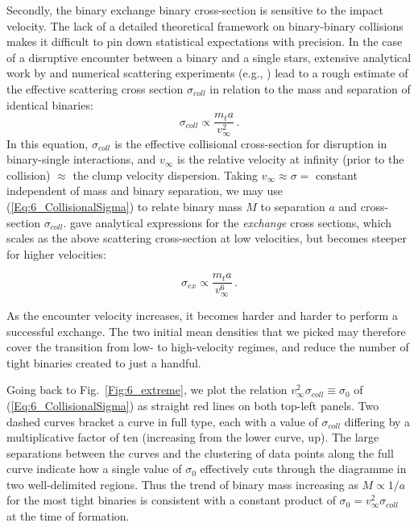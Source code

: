 Secondly, the binary exchange binary cross-section is sensitive to the impact velocity. The lack of a detailed theoretical framework on binary-binary collisions makes it difficult to pin down statistical expectations with precision. In the case of a disruptive encounter between a binary and a single stars, extensive 
analytical work by \cite{Mikkola1983,Mikkola1984a,Mikkola1984b} and numerical scattering experiments (e.g., \citealt{Heggie1996,Fregeau2004}) lead to a rough estimate of the effective scattering cross section $\sigma_{coll}$ in relation to the mass and separation of identical binaries: 
\begin{equation}
\sigma_{coll} \propto \frac{m_t a}{v_\infty^2}\, . 
\label{Eq:6_CollisionalSigma} 
\end{equation}
In this equation, $\sigma_{coll}$ is the effective collisional cross-section for disruption in binary-single  interactions, and $v_\infty$ is the relative velocity at infinity (prior to the collision) $\approx $ the clump velocity dispersion. Taking $ v_\infty \approx \sigma = $ constant independent of mass and binary separation, we may use (\ref{Eq:6_CollisionalSigma}) to relate binary mass $M$ to separation $a$ and  cross-section $\sigma_{coll}$. 
\cite{Hut1983,Hut1983b} gave analytical expressions for the \textit{exchange} cross sections, which scales as the above scattering cross-section at low velocities, but becomes steeper for higher velocities:

\begin{equation}
\sigma_{ex} \propto \frac{m_t a}{v_\infty^6}\, . 
\label{Eq:6_ExchangeSigma} 
\end{equation}
  
As the encounter velocity increases, it becomes harder and harder to perform a successful exchange. The two initial mean 
densities that we picked may therefore cover the transition from low- to high-velocity regimes, and reduce the number of tight binaries created to just a handful. 

Going back to Fig.~\ref{Fig:6_extreme}, we plot the relation $v^2_\infty \sigma_{coll} \equiv \sigma_0$ of (\ref{Eq:6_CollisionalSigma}) as straight red lines on both top-left panels. Two dashed curves bracket a curve in full type, each with a value of  $\sigma_{coll}$ differing by a multiplicative factor of ten (increasing from the lower curve, up).  The large separations between the curves and the clustering of data points along the full curve indicate how a single value of $\sigma_0$ effectively cuts through the diagramme in two well-delimited regions.  
Thus the trend of binary mass increasing as $M \propto 1/a$ for the most tight binaries is consistent with a constant product of $\sigma_0 = v^2_\infty \sigma_{coll}$ at the time of formation. 

